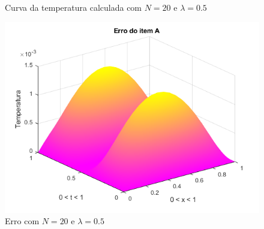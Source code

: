 \documentclass[12pt]{article}
\begin{document}
\begin{spacing}{1.5}
\begin{figure}
    \caption{Curva da temperatura calculada com $N=20$ e $\lambda=0.5$}
    \label{fig:A_n20lambda0-5_calc}
\end{figure}
\begin{figure}
    \centering
    \includegraphics[width=0.8\linewidth]{Primeira_Tarefa/ItemA/n20_lambda0-5_erro.png}
    \caption{Erro com $N=20$ e $\lambda=0.5$}
    \label{fig:A_n20lambda0-5_erro}
\end{figure}



\end{spacing}
\end{document}
